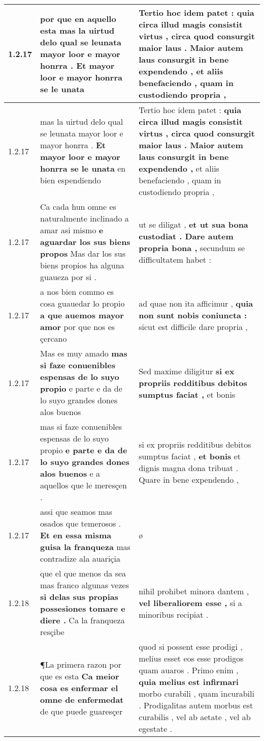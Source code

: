\begin{tabular}{|p{1cm}|p{6.5cm}|p{6.5cm}|}
1.2.17 & por que en aquello esta \textbf{ mas la uirtud delo qual se leunata mayor loor e mayor honrra . } Et mayor loor e mayor honrra se le unata & Tertio hoc idem patet : \textbf{ quia circa illud magis consistit virtus , circa quod consurgit maior laus . Maior autem laus consurgit in bene expendendo , } et aliis benefaciendo , quam in custodiendo propria , \\\hline
1.2.17 & mas la uirtud delo qual se leunata mayor loor e mayor honrra . \textbf{ Et mayor loor e mayor honrra se le unata } en bien espendiendo & Tertio hoc idem patet : \textbf{ quia circa illud magis consistit virtus , circa quod consurgit maior laus . Maior autem laus consurgit in bene expendendo , } et aliis benefaciendo , quam in custodiendo propria , \\\hline
1.2.17 & Ca cada hun omne es naturalmente inclinado a amar asi mismo \textbf{ e aguardar los sus biens propos } Mas dar los sus biens propios ha alguna guaueza por si . & ut se diligat , \textbf{ et ut sua bona custodiat . Dare autem propria bona , } secundum se difficultatem habet : \\\hline
1.2.17 & a nos bien commo es cosa guauedar lo propio \textbf{ a que auemos mayor amor } por que nos es çercano & ad quae non ita afficimur , \textbf{ quia non sunt nobis coniuncta : } sicut est difficile dare propria , \\\hline
1.2.17 & Mas es muy amado \textbf{ mas si faze conuenibles espensas de lo suyo propio } e parte e da de lo suyo grandes dones alos buenos & Sed maxime diligitur \textbf{ si ex propriis redditibus debitos sumptus faciat , } et bonis \\\hline
1.2.17 & mas si faze conuenibles espensas de lo suyo propio \textbf{ e parte e da de lo suyo grandes dones alos buenos } e a aquellos que le meresçen . & si ex propriis redditibus debitos sumptus faciat , \textbf{ et bonis } et dignis magna dona tribuat . Quare in bene expendendo , \\\hline
1.2.17 & assi que seamos mas osados que temerosos . \textbf{ Et en essa misma guisa la franqueza } mas contradize ala auariçia & ø \\\hline
1.2.18 & que el que menos da sea mas franco algunas vezes \textbf{ si delas sus propias possesiones tomare e diere . } Ca la franqueza resçibe & nihil prohibet minora dantem , \textbf{ vel liberaliorem esse , } si a minoribus recipiat . \\\hline
1.2.18 & ¶La primera razon por que es esta \textbf{ Ca meior cosa es enfermar el omne de enfermedat } de que puede guaresçer & quod si possent esse prodigi , melius esset eos esse prodigos quam auaros . Primo enim , \textbf{ quia melius est infirmari } morbo curabili , quam incurabili . Prodigalitas autem morbus est curabilis , vel ab aetate , vel ab egestate . \\\hline

\end{tabular}

